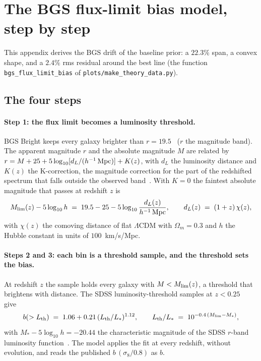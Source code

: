 \section{The BGS flux-limit bias model, step by step}
\label{app:bgsflux}

This appendix derives the BGS drift of the baseline prior: a $22.3\%$
span, a convex shape, and a $2.4\%$ rms residual around the best line
(the function \texttt{bgs\_flux\_limit\_bias} of
\texttt{plots/make\_theory\_data.py}).

\subsection{The four steps}
\label{sec:bgssteps}

\paragraph{Step 1: the flux limit becomes a luminosity threshold.}
BGS Bright keeps every galaxy brighter than $r = 19.5$~\cite{Hahn2023}
($r$ the magnitude band).  The apparent magnitude $r$ and the absolute
magnitude $M$ are related by
$r = M + 25 + 5\log_{10}[d_L/(h^{-1}\,{\rm Mpc})] + K(z)$, with $d_L$
the luminosity distance and $K(z)$ the K-correction, the magnitude
correction for the part of the redshifted spectrum that falls outside
the observed band~\cite{BlantonRoweis2007}.  With $K = 0$ the faintest
absolute magnitude that passes at redshift $z$ is
\begin{equation}
  M_{\rm lim}(z) - 5\log_{10} h
  \;=\;
  19.5 - 25 - 5\log_{10} \frac{d_L(z)}{h^{-1}\,{\rm Mpc}},
  \qquad
  d_L(z) \;=\; (1+z)\,\chi(z),
  \label{eq:bgsmlim}
\end{equation}
with $\chi(z)$ the comoving distance of flat $\Lambda$CDM with
$\Omega_m = 0.3$ and $h$ the Hubble constant in units of
$100$~km/s/Mpc.

\paragraph{Steps 2 and 3: each bin is a threshold sample, and the
threshold sets the bias.}
At redshift $z$ the sample holds every galaxy with
$M < M_{\rm lim}(z)$, a threshold that brightens with distance.  The
SDSS luminosity-threshold samples at $z < 0.25$~\cite{Zehavi2011}
give
\begin{equation}
  b(>L_{\rm th})
  \;=\;
  1.06 + 0.21\,(L_{\rm th}/L_*)^{1.12},
  \qquad
  L_{\rm th}/L_* \;=\; 10^{-0.4\,(M_{\rm lim} - M_*)},
  \label{eq:bgszehavi}
\end{equation}
with $M_* - 5\log_{10} h = -20.44$ the characteristic magnitude of the
SDSS $r$-band luminosity function~\cite{Blanton2003}.  The model
applies the fit at every redshift, without evolution, and reads the
published $b\,(\sigma_8/0.8)$ as $b$.

